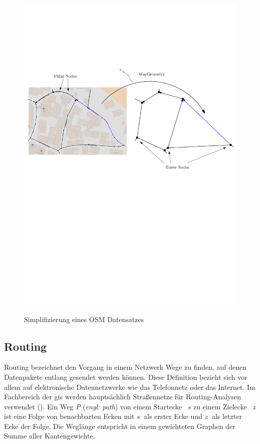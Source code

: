 \begin{figure}[h]
\centering
\includegraphics[width = \textwidth]{../media/towers.pdf} \\
\caption{Simplifizierung eines OSM Datensatzes}
\label{fig:tower}
\end{figure}

\subsection{Routing}

Routing bezeichnet den Vorgang in einem Netzwerk Wege zu finden, auf denen Datenpakete entlang gesendet werden können.
Diese Definition bezieht sich vor allem auf elektronische Datennetzwerke wie das Telefonnetz oder das Internet.
Im Fachbereich der \gls{gis} werden hauptsächlich Straßennetze für Routing-Analysen verwendet (\cite[165]{handbook}).
Ein Weg \textit{P} (\textit{engl: path}) von einem Startecke ~$s$ zu einem Zielecke ~$z$ ist eine Folge von benachbarten Ecken mit $s~$ als erster Ecke und $z~$ als letzter Ecke der Folge.
Die Weglänge entspricht in einem gewichteten Graphen der Summe aller Kantengewichte.

